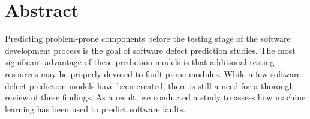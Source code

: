 \newpage
\chapter*{\centering Abstract}
{

Predicting problem-prone components before the testing stage of the software development process is the goal of software defect prediction studies. The most significant advantage of these prediction models is that additional testing resources may be properly devoted to fault-prone modules. While a few software defect prediction models have been created, there is still a need for a thorough review of these findings. As a result, we conducted a study to assess how machine learning has been used to predict software faults.
}

 